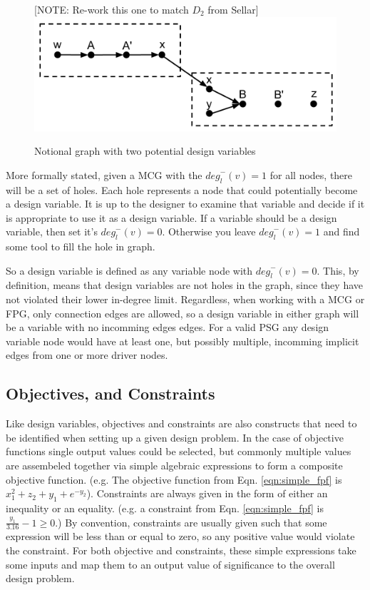 \begin{figure}[htb!]
  \begin{center}
  [NOTE: Re-work this one to match $D_2$ from Sellar]
    \includegraphics[width=.6\textwidth]{images/design_vars_graph}
  \end{center}
  \caption{Notional graph with two potential design variables \label{f:designvars}}
\end{figure}

More formally stated, given a MCG with the ${deg}_l^-(v)=1$ for all nodes, 
there will be a set of holes. Each hole represents a node that could potentially 
become a design variable. It is up to the designer to examine that variable and 
decide if it is appropriate to use it as a design variable. If a variable should 
be a design variable, then set it's ${deg}_l^-(v)=0$. Otherwise you leave 
${deg}_l^-(v)=1$ and find some tool to fill the hole in graph. 

So a design variable is defined as any variable node with ${deg}_l^-(v)=0$. 
This, by definition, means that design variables are not holes in the graph, since 
they have not violated their lower in-degree limit. Regardless, 
when working with a MCG or FPG, only connection edges are allowed, so a design 
variable in either graph will be a variable with no incomming edges edges. For a valid PSG 
any design variable node would have at least one, but possibly multiple, incomming 
implicit edges from one or more driver nodes. 

\subsection{Objectives, and Constraints}
Like design variables, objectives and constraints are also constructs that need 
to be identified when setting up a given design problem. In the case of 
objective functions single output values could be selected, but commonly multiple 
values are assembeled together via simple algebraic expressions to form a composite 
objective function. (e.g. The objective function from Eqn. \ref{eqn:simple_fpf} is
$x_1^2+z_2+y_1+e^{-y_2}$). Constraints are always given in the 
form of either an inequality or an equality. (e.g. a constraint from Eqn. 
\ref{eqn:simple_fpf} is $\frac{y_1}{3.16}-1\geq0$.) By convention, 
constraints are usually given such that some expression will be less than or equal 
to zero, so any positive value would violate the constraint. For both objective 
and constraints, these simple expressions take some inputs and map them to an
output value of significance to the overall design problem. 

